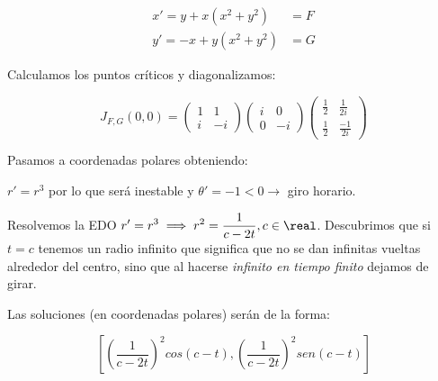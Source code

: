 \documentclass[nochap]{apuntes}
\begin{document}
\begin{problem}[11]
\[\begin{array}{cc}
x'=y+x(x^2+y^2) &= F\\
y' = -x+y(x^2+y^2) &= G
\end{array}\]

\solution
Calculamos los puntos críticos y diagonalizamos:

\[J_{F,G}(0,0) = \begin{pmatrix}
1&1\\i&-i
\end{pmatrix}\begin{pmatrix}
i&0\\0&-i
\end{pmatrix}\begin{pmatrix}
\frac{1}{2}&\frac{1}{2i}\\\frac{1}{2}&\frac{-1}{2i}
\end{pmatrix}\]

Pasamos a coordenadas polares obteniendo:

$r' = r^3$ por lo que será inestable y $ \theta' = -1 < 0\to$ giro horario.

Resolvemos la EDO $\displaystyle r'=r^3 \implies r^2 = \frac{1}{c-2t},c\in\real$. Descubrimos que si $t = c$ tenemos un radio infinito que significa que no se dan infinitas vueltas alrededor del centro, sino que al hacerse \textit{infinito en tiempo finito} dejamos de girar.

Las soluciones (en coordenadas polares) serán de la forma:

\[\left[\left(\frac{1}{c-2t}\right)^2cos(c-t),\left(\frac{1}{c-2t}\right)^2sen(c-t)\right]\]

\end{problem}
\end{document}
